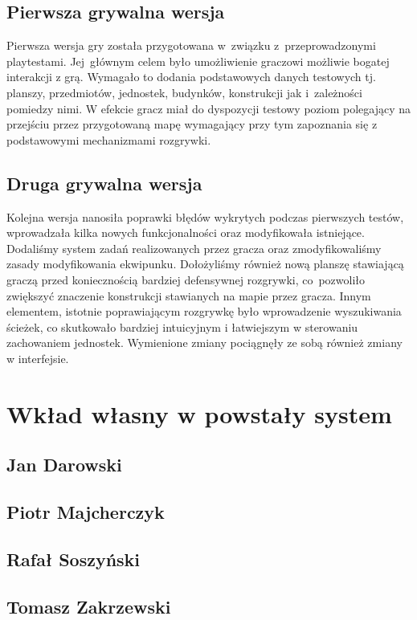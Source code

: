 \documentclass[licencjacka]{pracamgr}
\begin{document}
  \section{Pierwsza grywalna wersja}
  Pierwsza wersja gry została przygotowana w~związku z~przeprowadzonymi playtestami. Jej~głównym celem było 
  umożliwienie graczowi możliwie bogatej interakcji z grą. Wymagało to dodania podstawowych
  danych testowych tj. planszy, przedmiotów, jednostek, budynków, konstrukcji jak i~zależności pomiedzy nimi.
  W efekcie gracz miał do dyspozycji testowy poziom polegający na przejściu przez przygotowaną mapę wymagający
  przy tym zapoznania się z podstawowymi mechanizmami rozgrywki.
  
  \section{Druga grywalna wersja}
  Kolejna wersja nanosiła poprawki błędów wykrytych podczas pierwszych testów, wprowadzała kilka nowych funkcjonalności
  oraz modyfikowała istniejące. Dodaliśmy system zadań realizowanych przez gracza oraz zmodyfikowaliśmy zasady modyfikowania
  ekwipunku. Dołożyliśmy również nową planszę stawiającą graczą przed koniecznością bardziej defensywnej rozgrywki, 
  co~pozwoliło zwiększyć znaczenie konstrukcji stawianych na mapie przez gracza. Innym elementem, istotnie poprawiającym 
  rozgrywkę było wprowadzenie wyszukiwania ścieżek, co skutkowało bardziej intuicyjnym i łatwiejszym w sterowaniu 
  zachowaniem jednostek. Wymienione zmiany pociągnęły ze sobą również zmiany w interfejsie.

\chapter{Wkład własny w powstały system}

  \section{Jan Darowski}

  \section{Piotr Majcherczyk}

  \section{Rafał Soszyński}

  \section{Tomasz Zakrzewski}
\end{document}
